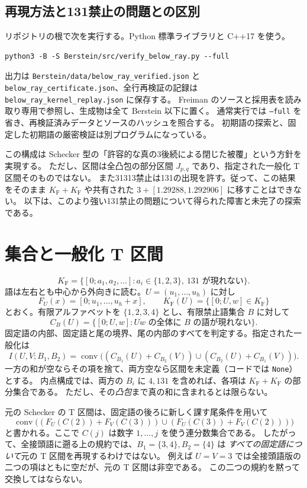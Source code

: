 \documentclass[10pt,a4paper]{article}
\newcommand{\KF}{K_{\mathrm F}}
\newcommand{\conv}{\operatorname{conv}}
\begin{document}
\subsection{再現方法と131禁止の問題との区別}
リポジトリの根で次を実行する。Python 標準ライブラリと C++17 を使う。
\begin{verbatim}
python3 -B -S Berstein/src/verify_below_ray.py --full
\end{verbatim}
出力は \texttt{Berstein/data/below\_ray\_verified.json} と
\texttt{below\_ray\_certificate.json}、全行再検証の記録は
\texttt{below\_ray\_kernel\_replay.json} に保存する。
Freiman のソースと採用表を読み取り専用で参照し、生成物は全て Berstein 以下に置く。
通常実行では \texttt{--full} を省き、再検証済みデータとソースのハッシュを照合する。
初期語の探索と、固定した初期語の厳密検証は別プログラムになっている。

この構成は Schecker 型の「許容的な真の3後続による閉じた被覆」という方針を実現する。
ただし、区間は全凸包の部分区間 $J_{p,q}$ であり、指定された一般化 T 区間そのものではない。
また31313禁止は131の出現を許す。従って、この結果をそのまま
$\KF+\KF$ や共有された $3+[1.29288,1.292906]$ に移すことはできない。
以下は、このより強い131禁止の問題について得られた障害と未完了の探索である。

\section{集合と一般化 T 区間}
\[
 \KF=\{[0;a_1,a_2,\ldots]:a_i\in\{1,2,3\},\ 131\text{ が現れない}\}.
\]
語は左右とも中心から外向きに読む。$U=(u_1,\ldots,u_h)$ に対し
\[
 F_U(x)=[0;u_1,\ldots,u_h+x],\qquad
 \KF(U)=\{[0;U,w]\in\KF\}
\]
とおく。有限アルファベットを $\{1,2,3,4\}$ とし、有限禁止語集合 $B$ に対して
\[
 C_B(U)=\{[0;U,w]:Uw\text{ の全体に }B\text{ の語が現れない}\}.
\]
固定語の内部、固定語と尾の境界、尾の内部のすべてを判定する。指定された一般化は
\[
 I(U,V;B_1,B_2)=\conv\bigl((C_{B_1}(U)+C_{B_2}(V))
          \cup(C_{B_2}(U)+C_{B_1}(V))\bigr).
\]
一方の和が空ならその項を捨て、両方空なら区間を未定義（コードでは \texttt{None}）とする。
内点構成では、両方の $B_i$ に $4,131$ を含めれば、各項は $\KF+\KF$ の部分集合である。
ただし、その\emph{凸包}まで真の和に含まれるとは限らない。

元の Schecker の T 区間は、固定語の後ろに新しく課す尾条件を用いて
\[
 \conv\bigl((F_U(C(2))+F_V(C(3)))\cup(F_U(C(3))+F_V(C(2)))\bigr)
\]
と書かれる。ここで $C(j)$ は数字 $1,\ldots,j$ を使う連分数集合である。
したがって、全接頭語に遡る上の規約では、$B_1=\{3,4\},B_2=\{4\}$ は
\emph{すべての固定語について}元の T 区間を再現するわけではない。
例えば $U=V=3$ では全接頭語版の二つの項はともに空だが、元の T 区間は非空である。
この二つの規約を黙って交換してはならない。
\end{document}
